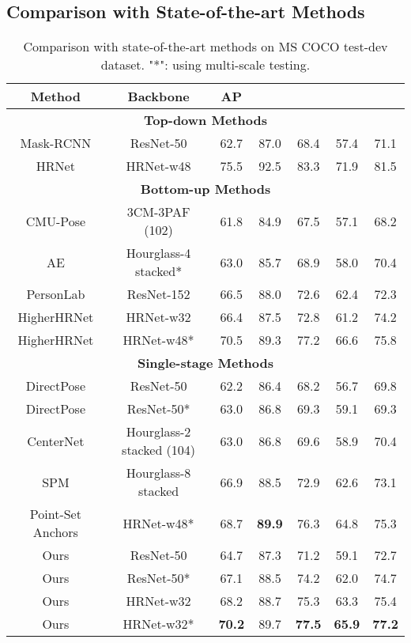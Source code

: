 \documentclass[11pt,twocolumn,journal]{IEEEtran}
\begin{document}
\subsection{Comparison with State-of-the-art Methods}
\begin{table*}[t]
\begin{center}
\begin{tabular}{ccccccc}
\toprule
Method & Backbone & AP &  &  &  &   \\
 \midrule
 \multicolumn{7}{c}{\textbf{Top-down Methods}} \\
 \midrule
 Mask-RCNN \cite{he2017mask} & ResNet-50 & 62.7 & 87.0 & 68.4 & 57.4 & 71.1 \\
 HRNet \cite{sun2019deep} & HRNet-w48 & 75.5 & 92.5 & 83.3 & 71.9 & 81.5 \\
 \midrule
 \multicolumn{7}{c}{\textbf{Bottom-up Methods}} \\
 \midrule
 CMU-Pose \cite{cao2017realtime} & 3CM-3PAF (102) & 61.8 & 84.9 & 67.5 & 57.1 & 68.2 \\
 AE \cite{newell2017associative} & Hourglass-4 stacked* & 63.0 & 85.7 & 68.9 & 58.0 & 70.4 \\
 PersonLab \cite{papandreou2018personlab} & ResNet-152 & 66.5 & 88.0 & 72.6 & 62.4 & 72.3 \\
 HigherHRNet \cite{higherhrnet2020} & HRNet-w32 & 66.4 & 87.5 & 72.8 & 61.2 & 74.2 \\
 HigherHRNet \cite{higherhrnet2020} & HRNet-w48* & 70.5 & 89.3 & 77.2 & 66.6 & 75.8 \\
\midrule
\multicolumn{7}{c}{\textbf{Single-stage Methods}} \\
\midrule
 DirectPose \cite{directpose19} & ResNet-50 & 62.2 & 86.4 & 68.2 & 56.7 & 69.8 \\
 DirectPose \cite{directpose19} & ResNet-50* & 63.0 & 86.8 & 69.3 & 59.1 & 69.3 \\
 CenterNet \cite{centernet19} & Hourglass-2 stacked (104) & 63.0 & 86.8 & 69.6 & 58.9 & 70.4 \\
 SPM \cite{spm19} & Hourglass-8 stacked & 66.9 & 88.5 & 72.9 & 62.6 & 73.1\\
 Point-Set Anchors \cite{pointset20} & HRNet-w48* & 68.7 & \textbf{89.9} & 76.3 & 64.8 & 75.3 \\
\midrule
 Ours & ResNet-50 & 64.7 & 87.3 & 71.2 & 59.1 & 72.7\\
 Ours & ResNet-50* & 67.1 & 88.5 & 74.2 & 62.0 & 74.7\\
 Ours & HRNet-w32 & 68.2 & 88.7 & 75.3 & 63.3 & 75.4 \\
 Ours & HRNet-w32* & \textbf{70.2} & 89.7 & \textbf{77.5} & \textbf{65.9} & \textbf{77.2} \\
\bottomrule
\end{tabular}
\end{center}
\setlength{\abovecaptionskip}{-0.1cm}
\caption{Comparison with state-of-the-art methods on MS COCO test-dev dataset. "*": using multi-scale testing. 
}
\label{tab_compare}
\end{table*}
\end{document}
